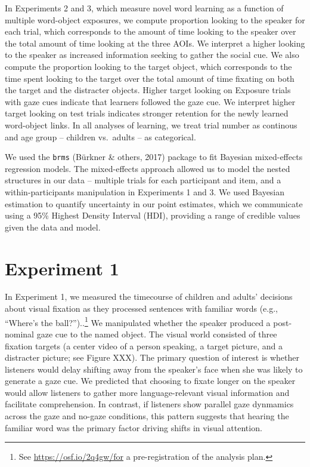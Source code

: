 \documentclass[man,floatsintext]{apa6}
\let\rmarkdownfootnote\footnote%
\def\footnote{\protect\rmarkdownfootnote}
\begin{document}
In Experiments 2 and 3, which measure novel word learning as a function
of multiple word-object exposures, we compute proportion looking to the
speaker for each trial, which corresponds to the amount of time looking
to the speaker over the total amount of time looking at the three AOIs.
We interpret a higher looking to the speaker as increased information
seeking to gather the social cue. We also compute the proportion looking
to the target object, which corresponds to the time spent looking to the
target over the total amount of time fixating on both the target and the
distracter objects. Higher target looking on Exposure trials with gaze
cues indicate that learners followed the gaze cue. We interpret higher
target looking on test trials indicates stronger retention for the newly
learned word-object links. In all analyses of learning, we treat trial
number as continous and age group -- children vs.~adults -- as
categorical.

We used the \texttt{brms} (Bürkner \& others, 2017) package to fit
Bayesian mixed-effects regression models. The mixed-effects approach
allowed us to model the nested structures in our data -- multiple trials
for each participant and item, and a within-participants manipulation in
Experiments 1 and 3. We used Bayesian estimation to quantify uncertainty
in our point estimates, which we communicate using a 95\% Highest
Density Interval (HDI), providing a range of credible values given the
data and model.

\section{Experiment 1}\label{experiment-1}

In Experiment 1, we measured the timecourse of children and adults'
decisions about visual fixation as they processed sentences with
familiar words (e.g., \enquote{Where's the ball?})..\footnote{See
  \url{https://osf.io/2q4gw/for} a pre-registration of the analysis
  plan.} We manipulated whether the speaker produced a post-nominal gaze
cue to the named object. The visual world consisted of three fixation
targets (a center video of a person speaking, a target picture, and a
distracter picture; see Figure XXX). The primary question of interest is
whether listeners would delay shifting away from the speaker's face when
she was likely to generate a gaze cue. We predicted that choosing to
fixate longer on the speaker would allow listeners to gather more
language-relevant visual information and facilitate comprehension. In
contrast, if listeners show parallel gaze dynmamics across the gaze and
no-gaze conditions, this pattern suggests that hearing the familiar word
was the primary factor driving shifts in visual attention.
\end{document}
